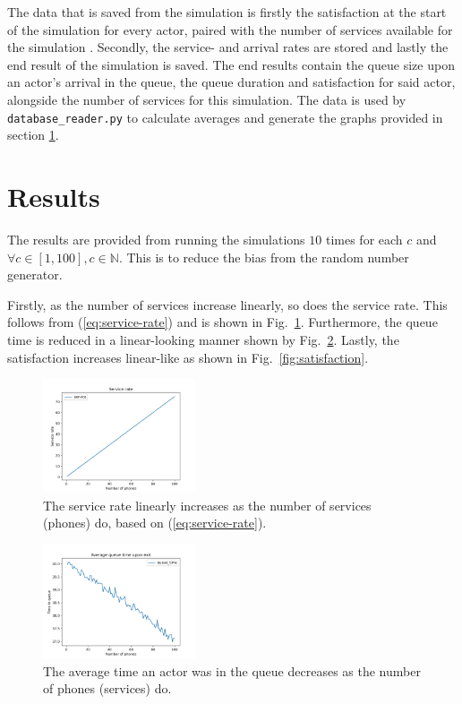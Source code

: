 \documentclass[conference]{IEEEtran}
\begin{document}
The data that is saved from the simulation is firstly the
satisfaction at the start of the simulation for every actor, paired
with the number of services available for the simulation
\cite{AvekvistLorentzonDta400}. Secondly, the service- and arrival
rates are stored and lastly the end result of the simulation is
saved. The end results contain the queue size upon an actor's
arrival in the queue, the queue duration and satisfaction for said
actor, alongside the number of services for this simulation. The
data is used by \verb|database_reader.py| to calculate averages and
generate the graphs provided in section \ref{sec:results}.

\section{Results}
\label{sec:results}

The results are provided from running the simulations $10$ times
for each $c$ and $\forall c \in [1, 100], c \in \mathbb{N}$. This
is to reduce the bias from the random number generator.

Firstly, as the number of services increase linearly, so does the
service rate. This follows from (\ref{eq:service-rate}) and is
shown in Fig.~\ref{fig:service-rate}. Furthermore, the queue time
is reduced in a linear-looking manner shown by
Fig.~\ref{fig:queue-time}. Lastly, the satisfaction increases
linear-like as shown in Fig.~\ref{fig:satisfaction}.

\begin{figure}[!b]
    \centerline{
        \includegraphics[width=0.4\textwidth]{figures/service.png}
    }
    \caption{
        The service rate linearly increases as the number of 
        services (phones) do, based on (\ref{eq:service-rate}).
    }
    \label{fig:service-rate}
\end{figure}

\begin{figure}[!t]
    \centerline{
        \includegraphics[width=0.4\textwidth]{figures/queue_time.png}
    }
    \caption{
        The average time an actor was in the queue decreases as
        the number of phones (services) do.
    }
    \label{fig:queue-time}
\end{figure}
\end{document}
